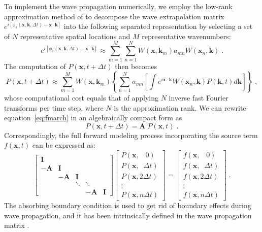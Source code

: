 To implement the wave propagation numerically, we employ the low-rank approximation method of \cite{fomel13} to decompose the wave extrapolation matrix
$e^{i [\phi_1(\mathbf{x},\mathbf{k},\Delta t)-\mathbf{x} \cdot \mathbf{k}]}$ into the following separated representation by selecting a set of $N$
representative spatial locations and $M$ representative wavenumbers:
\begin{equation}
	\label{lowrank}
	e^{i [\phi_1(\mathbf{x},\mathbf{k},\Delta t)-\mathbf{x} \cdot \mathbf{k}]} \approx \sum_{m=1}^{M}\sum_{n=1}^{N} W(\mathbf{x},\mathbf{k}_m) a_{mn} W(\mathbf{x}_n,\mathbf{k}) \;.
\end{equation}
The computation of $P(\mathbf{x},t+\Delta t)$ then becomes
\begin{equation}
	\label{eq:fmarch}
	P(\mathbf{x},t+\Delta t) \approx \sum_{m=1}^{M}  W(\mathbf{x},\mathbf{k}_m) \left\{\sum_{n=1}^{N}a_{mn} \left[ \int e^{i\mathbf{x} \cdot \mathbf{k}} W(\mathbf{x}_n,\mathbf{k}) P(\mathbf{k},t) d\mathbf{k} \right]\right\} \; ,
\end{equation}
whose computational cost equals that of applying $N$ inverse fast Fourier transforms per time step, where $N$ is the approximation rank.
We can rewrite equation~\ref{eq:fmarch} in an algebraically compact form as
\begin{equation}
	\label{eq:compact}
	P(\mathbf{x},t+\Delta t) = \mathbf{A} \; P(\mathbf{x},t) \; .
\end{equation}
Correspondingly, the full forward modeling process incorporating the source term $f(\mathbf{x},t)$ can be expressed as:
\begin{equation}
	\label{eq:matrix1}
	\left[ \begin{array}{ccccc}
			\mathbf{I}  &  &  &  & \\
			-\mathbf{A} & \mathbf{I} & & &\\
						& -\mathbf{A} & \mathbf{I} & & \\
			   & & \ddots & \ddots & \\
			   & & & -\mathbf{A} & \mathbf{I}
	\end{array} \right]
	\left[ \begin{array}{c}
			P(\mathbf{x}, \;\;\; 0) \\
			P(\mathbf{x}, \;\; \Delta t) \\
			P(\mathbf{x}, 2\Delta t) \\
			\vdots \\
			P(\mathbf{x}, n\Delta t)
	\end{array} \right]
	=
	\left[ \begin{array}{c}
			f(\mathbf{x}, \; \; \; 0) \\
			f(\mathbf{x}, \; \; \Delta t) \\
			f(\mathbf{x}, 2\Delta t) \\
			\vdots \\
			f(\mathbf{x}, n\Delta t)
	\end{array} \right] \; .
\end{equation}
The absorbing boundary condition is used to get rid of boundary effects during wave propagation, and it has been intrinsically defined in the wave propagation matrix \cite[]{sun16}.

